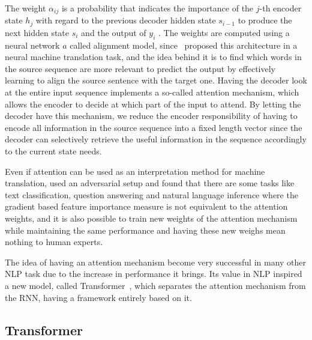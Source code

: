 The weight $\alpha_{i j}$ is a probability that indicates the importance of the $j$-th encoder state $h_j$ with regard to the previous decoder hidden state $s_{i-1}$ to produce the next hidden state $s_i$ and the output of $y_i$ . The weights are computed using a neural network $a$ called alignment model, since~\cite{bahdanau2014neural} proposed this architecture in a neural machine translation task, and the idea behind it is to find which words in the source sequence are more relevant to predict the output by effectively learning to align the source sentence with the target one. Having the decoder look at the entire input sequence implements a so-called attention mechanism, which allows the encoder to decide at which part of the input to attend.  By letting the decoder have this mechanism, we reduce the encoder responsibility of having to encode all information in the source sequence into a fixed length vector since the decoder can selectively retrieve the useful information in the sequence accordingly to the current state needs.

Even if attention can be used as an interpretation method for machine translation, \citet{sarthak2019attention} used an adversarial setup and found that there are some tasks like text classification, question answering and natural language inference where the gradient based feature importance measure is not equivalent to the attention weights, and it is also possible to train new weights of the attention mechanism while maintaining the same performance and having these new weighs mean nothing to human experts.

The idea of having an attention mechanism become very successful in many other NLP task due to the increase in performance it brings. Its value in NLP inspired a new model, called Transformer~\citep{vaswani2017attention}, which separates the attention mechanism from the RNN, having a framework entirely based on it. 

\subsection{Transformer}

